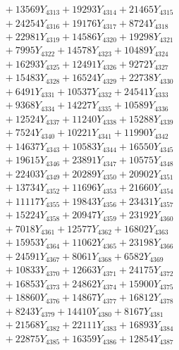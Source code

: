 \documentclass[a4paper,10pt]{article}
\begin{document}
{\begin{align}
&\;  + 13569 Y_{4313} + 19293 Y_{4314} + 21465 Y_{4315} \\[0.3ex]
&\;  + 24254 Y_{4316} + 19176 Y_{4317} + 8724 Y_{4318} \\[0.5ex]\allowbreak
&\;  + 22981 Y_{4319} + 14586 Y_{4320} + 19298 Y_{4321} \\[0.3ex]
&\;  + 7995 Y_{4322} + 14578 Y_{4323} + 10489 Y_{4324} \\[0.3ex]
&\;  + 16293 Y_{4325} + 12491 Y_{4326} + 9272 Y_{4327} \\[0.3ex]
&\;  + 15483 Y_{4328} + 16524 Y_{4329} + 22738 Y_{4330} \\[0.3ex]
&\;  + 6491 Y_{4331} + 10537 Y_{4332} + 24541 Y_{4333} \\[0.3ex]
&\;  + 9368 Y_{4334} + 14227 Y_{4335} + 10589 Y_{4336} \\[0.3ex]
&\;  + 12524 Y_{4337} + 11240 Y_{4338} + 15288 Y_{4339} \\[0.3ex]
&\;  + 7524 Y_{4340} + 10221 Y_{4341} + 11990 Y_{4342} \\[0.3ex]
&\;  + 14637 Y_{4343} + 10583 Y_{4344} + 16550 Y_{4345} \\[0.3ex]
&\;  + 19615 Y_{4346} + 23891 Y_{4347} + 10575 Y_{4348} \\[0.5ex]\allowbreak
&\;  + 22403 Y_{4349} + 20289 Y_{4350} + 20902 Y_{4351} \\[0.3ex]
&\;  + 13734 Y_{4352} + 11696 Y_{4353} + 21660 Y_{4354} \\[0.3ex]
&\;  + 11117 Y_{4355} + 19843 Y_{4356} + 23431 Y_{4357} \\[0.3ex]
&\;  + 15224 Y_{4358} + 20947 Y_{4359} + 23192 Y_{4360} \\[0.3ex]
&\;  + 7018 Y_{4361} + 12577 Y_{4362} + 16802 Y_{4363} \\[0.3ex]
&\;  + 15953 Y_{4364} + 11062 Y_{4365} + 23198 Y_{4366} \\[0.3ex]
&\;  + 24591 Y_{4367} + 8061 Y_{4368} + 6582 Y_{4369} \\[0.3ex]
&\;  + 10833 Y_{4370} + 12663 Y_{4371} + 24175 Y_{4372} \\[0.3ex]
&\;  + 16853 Y_{4373} + 24862 Y_{4374} + 15900 Y_{4375} \\[0.3ex]
&\;  + 18860 Y_{4376} + 14867 Y_{4377} + 16812 Y_{4378} \\[0.5ex]\allowbreak
&\;  + 8243 Y_{4379} + 14410 Y_{4380} + 8167 Y_{4381} \\[0.3ex]
&\;  + 21568 Y_{4382} + 22111 Y_{4383} + 16893 Y_{4384} \\[0.3ex]
&\;  + 22875 Y_{4385} + 16359 Y_{4386} + 12854 Y_{4387} \\[0.3ex]

\end{align}}
\end{document}
